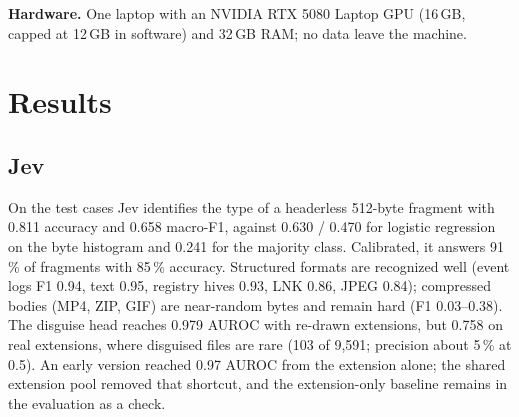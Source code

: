 \documentclass[conference]{IEEEtran}
\begin{document}
\textbf{Hardware.} One laptop with an NVIDIA RTX 5080 Laptop GPU (16\,GB, capped at 12\,GB in software) and 32\,GB
RAM; no data leave the machine.

\section{Results}

\subsection{Jev}
On the test cases Jev identifies the type of a headerless 512-byte fragment with 0.811 accuracy and 0.658 macro-F1,
against 0.630 / 0.470 for logistic regression on the byte histogram and 0.241 for the majority class. Calibrated, it
answers 91\,\% of fragments with 85\,\% accuracy. Structured formats are recognized well (event logs F1 0.94, text
0.95, registry hives 0.93, LNK 0.86, JPEG 0.84); compressed bodies (MP4, ZIP, GIF) are near-random bytes and remain
hard (F1 0.03--0.38). The disguise head reaches 0.979 AUROC with re-drawn extensions, but 0.758 on real extensions,
where disguised files are rare (103 of 9{,}591; precision about 5\,\% at 0.5). An early version reached 0.97 AUROC
from the extension alone; the shared extension pool removed that shortcut, and the extension-only baseline remains in
the evaluation as a check.
\end{document}
